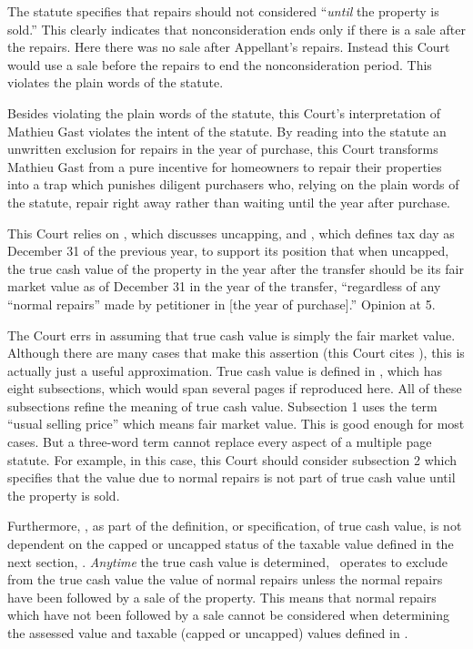 \documentclass[12pt,\documentclassflag]{michiganCourtOfAppealsBrief}
\begin{document}
The statute specifies that repairs should not considered ``\emph{until} the property is sold.'' This clearly indicates that nonconsideration ends only if there is a sale after the repairs. Here there was no sale after Appellant's repairs. Instead this Court would use a sale before the repairs to end the nonconsideration period. This violates the plain words of the statute.

Besides violating the plain words of the statute, this Court's interpretation of Mathieu Gast violates the intent of the statute.
By reading into the statute an unwritten exclusion for repairs in the year of purchase, this Court transforms Mathieu Gast from a pure incentive for homeowners to repair their properties into a trap which punishes diligent purchasers who, relying on the plain words of the statute, repair right away rather than waiting until the year after purchase.

This Court relies on \cite[s]{MCL 211.27a(3)}, which discusses uncapping, and \cite[s]{MCL 211.2(2)}, which defines tax day as December 31 of the previous year, to support its position that when uncapped, the true cash value of the property in the year after the transfer should be its fair market value as of December 31 in the year of the transfer, ``regardless of any ``normal repairs'' made by petitioner in [the year of purchase].'' 
Opinion at 5.

The Court errs in assuming that true cash value is simply the fair market value. Although there are many cases that make this assertion (this Court cites ), this is actually just a useful approximation. True cash value is defined in \cite{MCL 211.27}, which has eight subsections, which would span several pages if reproduced here. All of these subsections refine the meaning of true cash value. Subsection 1 uses the term ``usual selling price'' which means fair market value. This is good enough for most cases. But a three-word term cannot replace every aspect of a multiple page statute. For example, in this case, this Court should consider subsection 2 which specifies that the value due to normal repairs is not part of true cash value until the property is sold.

Furthermore, \mathieuGast, as part of the definition, or specification, of true cash value, is not dependent on the capped or uncapped status of the taxable value defined in the next section, \cite{MCL 211.27a}. \emph{Anytime} the true cash value is determined, \mathieuGast\ operates to exclude from the true cash value the value of normal repairs unless the normal repairs have been followed by a sale of the property. This means that normal repairs which have not been followed by a sale cannot be considered when determining the assessed value and taxable (capped or uncapped) values defined in \cite{MCL 211.27a}.
\end{document}
